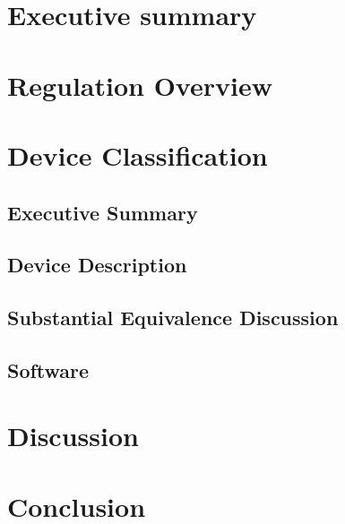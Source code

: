 \documentclass{article}
\begin{document}

\setcounter{tocdepth}{3}
\tableofcontents
\newpage

\section*{Executive summary}
\label{sec:exec-summary}

\section{Regulation Overview}
\label{sec:test-administration}

\section{Device Classification}
\label{sec:protocols}










\setcounter{subsection}{0}
\subsection{Executive Summary}
\subsection{Device Description}
\subsection{Substantial Equivalence Discussion}





\subsection{Software}




\section{Discussion}
\label{sec:discussion}

\section{Conclusion}
\label{sec:conclusion}


\newpage
{}


\end{document}
